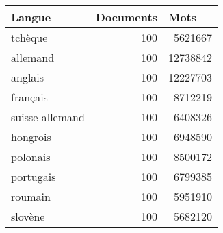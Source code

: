   \begin{tabular}{|p{2cm}|p{3cm}|p{1.2cm}|}%

\hline
\small{\textbf{Langue}} & \small{\textbf{Documents}} & \small{\textbf{Mots}} \\ %
\hline
  \small{tchèque} & \multicolumn{1}{r|}{\small{100}} & \multicolumn{1}{r|}{\small{5621667}} \\
  \small{allemand} & \multicolumn{1}{r|}{\small{100}} & \multicolumn{1}{r|}{\small{12738842}}\\
  \small{anglais} & \multicolumn{1}{r|}{\small{100}} & \multicolumn{1}{r|}{\small{12227703}}\\
  \small{français} & \multicolumn{1}{r|}{\small{100}} & \multicolumn{1}{r|}{\small{8712219}}\\
  \small{suisse allemand} & \multicolumn{1}{r|}{\small{100}} & \multicolumn{1}{r|}{\small{6408326}}\\
  \small{hongrois} & \multicolumn{1}{r|}{\small{100}} & \multicolumn{1}{r|}{\small{6948590}}\\
  \small{polonais} & \multicolumn{1}{r|}{\small{100}} & \multicolumn{1}{r|}{\small{8500172}}\\
  \small{portugais} & \multicolumn{1}{r|}{\small{100}} & \multicolumn{1}{r|}{\small{6799385}}\\
  \small{roumain} & \multicolumn{1}{r|}{\small{100}} & \multicolumn{1}{r|}{\small{5951910}}\\
  \small{slovène} & \multicolumn{1}{r|}{\small{100}} & \multicolumn{1}{r|}{\small{5682120}}\\
  \hline
\end{tabular}


